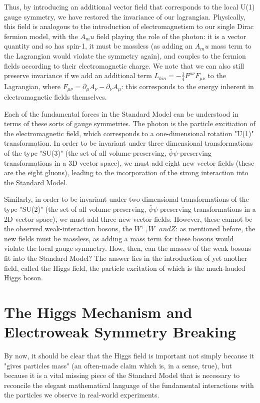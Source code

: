 Thus, by introducing an additional vector field that corresponds to the local U(1) gauge symmetry, we have restored the invariance of our lagrangian. Physically, this field is analogous to the introduction of electromagnetism to our single Dirac fermion model, with the $A_mu$ field playing the role of the photon: it is a vector quantity and so has spin-1, it must be massless (as adding an $A_mu$ mass term to the Lagrangian would violate the symmetry again), and couples to the fermion fields according to their electromagnetic charge. We note that we can also still preserve invariance if we add an additional term $L_{kin} = -\frac{1}{4}F^{\mu \nu} F_{\mu \nu}$ to the Lagrangian, where $F_{\mu \nu} = \partial_{\mu} A_{\nu} - \partial_{\nu} A_{\mu}$: this corresponds to the energy inherent in electromagnetic fields themselves. 

Each of the fundamental forces in the Standard Model can be understood in terms of these sorts of gauge symmetries. The photon is the particle excitiation of the electromagnetic field, which corresponds to a one-dimensional rotation "U(1)" transformation. In order to be invariant under three dimensional transformations of the type "SU(3)" (the set of all volume-preserving, $\bar{\psi}\psi$-preserving transformations in a 3D vector space), we must add eight new vector fields (these are the eight gluons), leading to the incorporation of the strong interaction into the Standard Model.

Similarly, in order to be invariant under two-dimensional transformations of the type "SU(2)" (the set of all volume-preserving, $\bar{\psi}\psi$-preserving transformations in a 2D vector space), we must add three new vector fields. However, these cannot be the observed weak-interaction bosons, the $W^{+}, W^{-} and Z$: as mentioned before, the new fields must be massless, as adding a mass term for these bosons would violate the local gauge symmetry. How, then, can the masses of the weak bosons fit into the Standard Model? The answer lies in the introduction of yet another field, called the Higgs field, the particle excitation of which is the much-lauded Higgs boson.

\section{The Higgs Mechanism and Electroweak Symmetry Breaking} \label{sec:EWSB} 

By now, it should be clear that the Higgs field is important not simply because it "gives particles mass" (an often-made claim which is, in a sense, true), but because it is a vital missing piece of the Standard Model that is necessary to reconcile the elegant mathematical language of the fundamental interactions with the particles we observe in real-world experiments.

